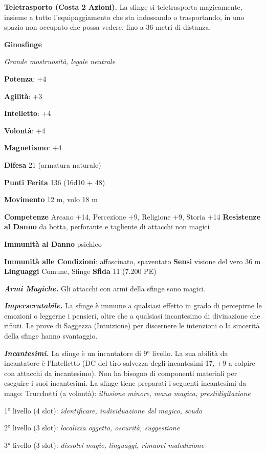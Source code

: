 \begin{multicols}{2}
\textbf{Teletrasporto (Costa 2 Azioni).} La sfinge si teletrasporta
magicamente, insieme a tutto l'equipaggiamento che sta indossando o
trasportando, in uno spazio non occupato che possa vedere, fino a 36
metri di distanza.


\textbf{Ginosfinge}

\emph{Grande mostruosità, legale neutrale}

\textbf{Potenza}: +4

\textbf{Agilità}: +3

\textbf{Intelletto}: +4

\textbf{Volontà}: +4

\textbf{Magnetismo}: +4

\textbf{Difesa} 21 (armatura naturale)

\textbf{Punti Ferita} 136 (16d10 + 48)

\textbf{Movimento} 12 m, volo 18 m

\textbf{Competenze} Arcano +14, Percezione +9, Religione +9, Storia +14
\textbf{Resistenze al Danno} da botta, perforante e tagliente di
attacchi non magici

\textbf{Immunità al Danno} psichico

\textbf{Immunità alle Condizioni}: affascinato, spaventato \textbf{Sensi}
visione del vero 36 m \textbf{Linguaggi} Comune,
Sfinge \textbf{Sfida} 11 (7.200 PE)\smallskip

\emph{\textbf{Armi Magiche.}} Gli attacchi con armi della sfinge sono
magici.

\emph{\textbf{Imperscrutabile.}} La sfinge è immune a qualsiasi effetto
in grado di percepirne le emozioni o leggerne i pensieri, oltre che a
qualsiasi incantesimo di divinazione che rifiuti. Le prove di Saggezza
(Intuizione) per discernere le intenzioni o la sincerità della sfinge
hanno svantaggio.

\emph{\textbf{Incantesimi.}} La sfinge è un incantatore di 9° livello.
La sua abilità da incantatore è l'Intelletto (DC del tiro salvezza
degli incantesimi 17, +9 a colpire con attacchi da incantesimo). Non ha
bisogno di componenti materiali per eseguire i suoi incantesimi. La
sfinge tiene preparati i seguenti incantesimi da mago: Trucchetti (a
volontà): \emph{illusione minore, mano magica,} \emph{prestidigitazione}

1° livello (4 slot): \emph{identificare, individuazione del magico,
scudo}

2° livello (3 slot): \emph{localizza oggetto, oscurità, suggestione}

3° livello (3 slot): \emph{dissolvi magie, linguaggi, rimuovi
maledizione}


\end{multicols}
